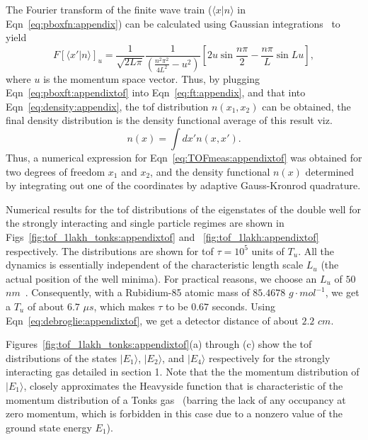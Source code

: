 The Fourier transform of the finite wave train ($\langle x|n\rangle$ in Eqn~\ref{eq:pboxfn:appendix}) can be calculated using Gaussian integrations~\cite{arfken} to yield
\begin{equation}
F[\langle x' | n \rangle]_u = \frac{1}{\sqrt{2L\pi}}  \frac{1}{\left( \frac{n^2 \pi^2}{4 L^2}-u^2 \right) } \left[ 2u \sin{\frac{n \pi}{2}}-\frac{n \pi}{L} \sin{L u} \right],
\label{eq:pboxft:appendixtof}
\end{equation}
where $u$ is the momentum space vector. Thus, by plugging Eqn~\ref{eq:pboxft:appendixtof} into Eqn~\ref{eq:ft:appendix}, and that into Eqn~\ref{eq:density:appendix}, the tof distribution $n(x_1,x_2)$ can be obtained, the final density distribution is the density functional average of this result viz.
\begin{equation}
n(x)=\int dx' n(x, x').
\end{equation}
Thus, a numerical expression for Eqn~\ref{eq:TOFmeas:appendixtof} was obtained for two degrees of freedom $x_1$ and $x_2$, and the density functional $n(x)$ determined by integrating out one of the coordinates by adaptive Gauss-Kronrod quadrature. 

Numerical results for the tof distributions of the eigenstates of the double well for the strongly interacting and single particle regimes are shown in Figs~\ref{fig:tof_1lakh_tonks:appendixtof} and ~\ref{fig:tof_1lakh:appendixtof} respectively. The distributions are shown for tof $\tau=10^5$ units of $T_u$. All the dynamics is essentially independent of the characteristic length scale $L_u$ (the actual position of the well minima). For practical reasons, we choose an $L_u$ of $50$ $nm$~\cite{mypaper}. Consequently, with a Rubidium-85 atomic mass of $85.4678$ $g·mol^{-1}$, we get a $T_u$ of about $6.7$  $\mu s$, which makes $\tau$ to be $0.67$ seconds. Using Eqn~\ref{eq:debroglie:appendixtof}, we get a detector distance of about $2.2$ $cm$. 

Figures~\ref{fig:tof_1lakh_tonks:appendixtof}(a) through (c) show the tof distributions of the states $| E_1\rangle$, $| E_2\rangle$, and $| E_4\rangle$ respectively for the strongly interacting gas detailed in section 1. Note that the the momentum distribution of $| E_1\rangle$, closely approximates the Heavyside function that is characteristic of the momentum distribution of a Tonks gas~\cite{tonks:gas} (barring the lack of any occupancy at zero momentum, which is forbidden in this case due to a nonzero value of the ground state energy $E_1$).

